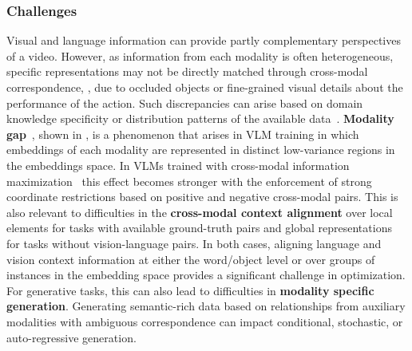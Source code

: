 \subsubsection{Challenges}

Visual and language information can provide partly complementary perspectives of a video. However, as information from each modality is often heterogeneous, specific representations may not be directly matched through cross-modal correspondence, \eg, due to occluded objects or fine-grained visual details about the performance of the action. Such discrepancies can arise based on domain knowledge specificity or distribution patterns of the available data~\citep{liang2024foundations}. \textbf{Modality gap}~\citep{liang2022mind}, shown in , is a phenomenon that arises in VLM training in which embeddings of each modality are represented in distinct low-variance regions in the embeddings space. In VLMs trained with cross-modal information maximization~\citep{bain2021frozen,lei2021less,li2020hero,li2022align,zhu2020actbert} this effect becomes stronger with the enforcement of strong coordinate restrictions based on positive and negative cross-modal pairs. This is also relevant to difficulties in the \textbf{cross-modal context alignment} over local elements for tasks with available ground-truth pairs and global representations for tasks without vision-language pairs. In both cases, aligning language and vision context information at either the word/object level or over groups of instances in the embedding space provides a significant challenge in optimization. For generative tasks, this can also lead to difficulties in \textbf{modality specific generation}. Generating semantic-rich data based on relationships from auxiliary modalities with ambiguous correspondence can impact conditional, stochastic, or auto-regressive generation.


